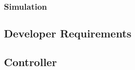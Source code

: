 \documentclass[11pt]{article}
\begin{document}
\subsubsection{Simulation}


\subsection{Developer Requirements}


\subsection{Controller}
\end{document}
